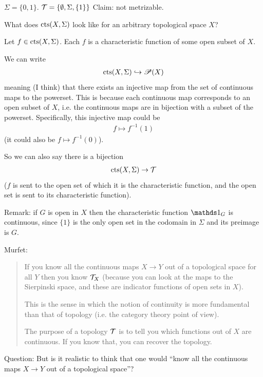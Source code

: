 \begin{example}
  $\Sigma = \{0, 1\}$.
  $\mathcal T = \{\emptyset, \Sigma, \{1\}\}$
  Claim: not metrizable.

  What does $\text{cts}(X, \Sigma)$ look like for an arbitrary topological space $X$?

  Let $f \in \text{cts}(X, \Sigma)$. Each $f$ is a characteristic function of some open subset of $X$.

  We can write
  \begin{align*}
    \text{cts}(X, \Sigma) \hookrightarrow \mathscr{P}(X)
  \end{align*}
  meaning (I think) that there exists an injective map from the set of continuous maps to the
  powerset. This is because each continuous map corresponds to an open subset of $X$, i.e. the
  continuous maps are in bijection with a subset of the powerset. Specifically, this injective map
  could be
  \begin{align*}
    f \mapsto f^{-1}(1)
  \end{align*}
  (it could also be $f \mapsto f^{-1}(0)$).

  So we can also say there is a bijection
  \begin{align*}
    \text{cts}(X, \Sigma) \to \mathcal T
  \end{align*}
  ($f$ is sent to the open set of which it is the characteristic function, and the open set is sent
  to its characteristic function).

  Remark: if $G$ is open in $X$ then the characteristic function $\ind_G$ is continuous,
  since $\{1\}$ is the only open set in the codomain in $\Sigma$ and its preimage is $G$.
\end{example}


Murfet:
\begin{quote}
  If you know all the continuous maps $X \to Y$ out of a topological space for all $Y$ then you
  know $\mathcal T_X$ (because you can look at the maps to the Sierpinski space, and these are indicator
  functions of open sets in $X$).

  This is the sense in which the notion of continuity is more fundamental than that of topology (i.e. the
  category theory point of view).

  The purpose of a topology $\mathcal T$ is to tell you which functions out of $X$ are continuous. If
  you know that, you can recover the topology.
\end{quote}

Question: But is it realistic to think that one would ``know all the continuous maps $X \to Y$ out
of a topological space​''?

